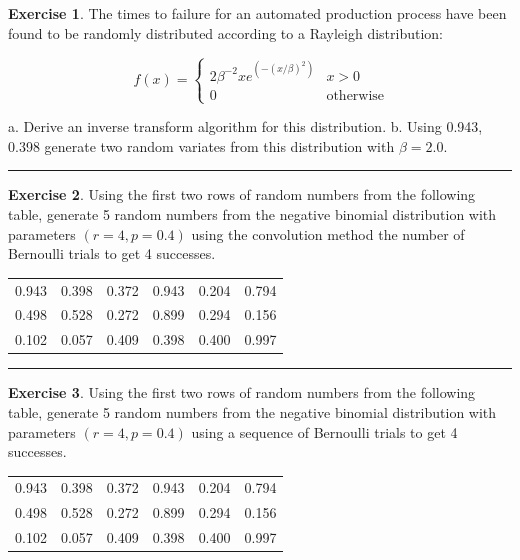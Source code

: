 \documentclass[
]{book}
\theoremstyle{definition}
\theoremstyle{definition}
\theoremstyle{definition}
\newtheorem{exercise}{Exercise}[chapter]
\theoremstyle{definition}
\theoremstyle{remark}
\begin{document}
\begin{exercise}
\protect\hypertarget{exr:AppRNRVP22}{}{\label{exr:AppRNRVP22} }The times to failure for an automated production process have been found to be
randomly distributed according to a Rayleigh distribution:

\[\ f(x) = 
   \begin{cases}
     2 \beta^{-2} x e^{(-(x/\beta)^2)} & x > 0\\
     0 & \text{otherwise}
  \end{cases}\]
\end{exercise}
a. Derive an inverse transform algorithm for this distribution.
b. Using 0.943, 0.398 generate two random variates from this distribution with \(\beta = 2.0\).

\begin{center}\rule{0.5\linewidth}{0.5pt}\end{center}

\begin{exercise}
\protect\hypertarget{exr:AppRNRVP23}{}{\label{exr:AppRNRVP23} }Using the first two rows of random numbers from the following table, generate 5 random numbers from the negative binomial distribution with parameters \((r = 4, p =0.4)\) using the
convolution method the number of Bernoulli trials to get 4 successes.
\end{exercise}

\begin{longtable}[]{@{}cccccc@{}}
\toprule
\endhead
0.943 & 0.398 & 0.372 & 0.943 & 0.204 & 0.794 \\
0.498 & 0.528 & 0.272 & 0.899 & 0.294 & 0.156 \\
0.102 & 0.057 & 0.409 & 0.398 & 0.400 & 0.997 \\
\bottomrule
\end{longtable}

\begin{center}\rule{0.5\linewidth}{0.5pt}\end{center}

\begin{exercise}
\protect\hypertarget{exr:AppRNRVP24}{}{\label{exr:AppRNRVP24} }Using the first two rows of random numbers from the following table, generate 5 random numbers from the negative binomial distribution with parameters \((r = 4, p =0.4)\) using a sequence of Bernoulli trials to get 4 successes.
\end{exercise}

\begin{longtable}[]{@{}cccccc@{}}
\toprule
\endhead
0.943 & 0.398 & 0.372 & 0.943 & 0.204 & 0.794 \\
0.498 & 0.528 & 0.272 & 0.899 & 0.294 & 0.156 \\
0.102 & 0.057 & 0.409 & 0.398 & 0.400 & 0.997 \\
\bottomrule
\end{longtable}
\end{document}

